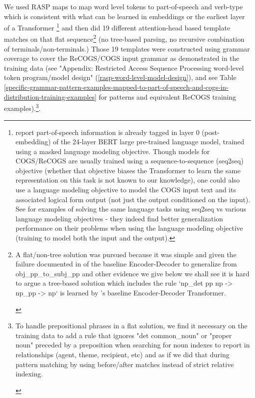 \documentclass[11pt]{article}
\begin{document}
We used RASP maps to map word level tokens to part-of-speech and verb-type which is consistent with what can be learned in embeddings or the earliest layer of a Transformer \citep{tenney2019bertrediscoversclassicalnlp}\footnote{\citep{tenney2019bertrediscoversclassicalnlp} report part-of-speech information is already tagged in layer 0 (post-embedding) of the 24-layer BERT large pre-trained language model, trained using a masked language modeling objective. Though models for COGS/ReCOGS are usually trained using a sequence-to-sequence (seq2seq) objective (whether that objective biases the Transformer to learn the same representation on this task is not known to our knowledge), one could also use a language modeling objective to model the COGS input text and its associated logical form output (not just the output conditioned on the input). See \citep{10.1162/tacl_a_00733} for examples of solving the same language tasks using seq2seq vs various language modeling objectives - they indeed find better generalization performance on their problems when using the language modeling objective (training to model both the input and the output).} and then did 19 different attention-head based template matches on that flat sequence\footnote{\begin{footnotesize}A flat/non-tree solution was pursued because it was simple and given the failure documented in \citep{Wu2023} of the baseline Encoder-Decoder to generalize from obj\_pp\_to\_subj\_pp and other evidence we give below we shall see it is hard to argue a tree-based solution which includes the rule `np\_det pp np -> np\_pp -> np` is learned by \citep{Wu2023}'s baseline Encoder-Decoder Transformer.\end{footnotesize}} (no tree-based parsing, no recursive combination of terminals/non-terminals.) Those 19 templates were constructed using grammar coverage \citep{fuzzingbook2023:GrammarCoverageFuzzer} to cover the ReCOGS/COGS input grammar as demonstrated in the training data (see "Appendix: Restricted Access Sequence Processing word-level token program/model design" (\ref{rasp-word-level-model-design}), and see Table \ref{specific-grammar-pattern-examples-mapped-to-part-of-speech-and-cogs-in-distribution-training-examples} for patterns and equivalent ReCOGS training examples).\footnote{\begin{footnotesize}To handle prepositional phrases in a flat solution, we find it necessary on the training data to add a rule that ignores "det common\_noun" or "proper noun" preceded by a preposition when searching for noun indexes to report in relationships (agent, theme, recipient, etc) and as if we did that during pattern matching by using before/after matches instead of strict relative indexing.\end{footnotesize}}.
\end{document}
